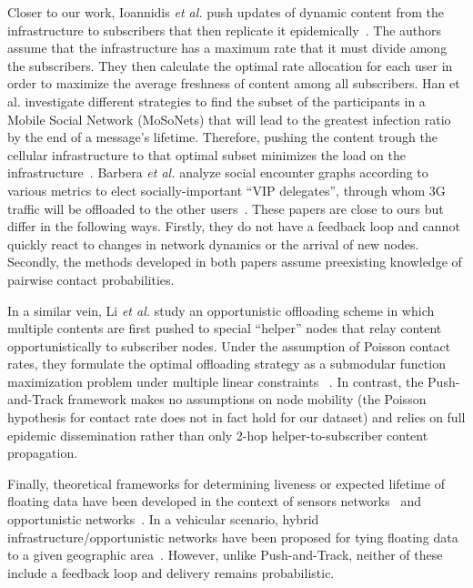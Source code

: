 \documentclass[preprint]{elsarticle}
\begin{document}
Closer to our work, Ioannidis \textit{et al.} push updates of dynamic content from the infrastructure to subscribers that then replicate it epidemically~\cite{ioa09}. The authors assume that the infrastructure has a maximum rate that it must divide among the subscribers. They then calculate the optimal rate allocation for each user in order to maximize the average freshness of content among all subscribers. Han et al. investigate different strategies to find the subset of the participants in a Mobile Social Network (MoSoNets) that will lead to the greatest infection ratio by the end of a message's lifetime. Therefore, pushing the content trough the cellular infrastructure to that optimal subset minimizes the load on the infrastructure~\cite{hui_offloading,Han2011}. Barbera \textit{et al.} analyze social encounter graphs according to various metrics to elect socially-important ``VIP delegates'', through whom 3G traffic will be offloaded to the other users~\cite{Barbera2011}. These papers are close to ours but differ in the following ways. Firstly, they do not have a feedback loop and cannot quickly react to changes in network dynamics or the arrival of new nodes. Secondly, the methods developed in both papers assume preexisting knowledge of pairwise contact probabilities. 

In a similar vein, Li \textit{et al.} study an opportunistic offloading scheme in which multiple contents are first pushed to special ``helper'' nodes that relay content opportunistically to subscriber nodes. Under the assumption of Poisson contact rates, they formulate the optimal offloading strategy as a submodular function maximization problem under multiple linear constraints
~\cite{Li2011}. In contrast, the Push-and-Track framework makes no assumptions on node mobility (the Poisson hypothesis for contact rate does not in fact hold for our dataset) and relies on full epidemic dissemination rather than only 2-hop helper-to-subscriber content propagation.

Finally, theoretical frameworks for determining liveness or expected lifetime of floating data have been developed in the context of sensors networks~\cite{Chakrabarti2007} and opportunistic networks~\cite{Hyytia2011}. In a vehicular scenario, hybrid infrastructure/opportunistic networks have been proposed for tying floating data to a given geographic area~\cite{Leontiadis2009,Jerbi2008}. However, unlike Push-and-Track, neither of these include a feedback loop and delivery remains probabilistic.
\end{document}
